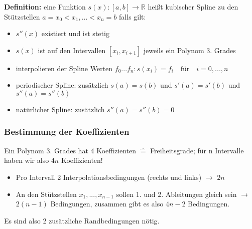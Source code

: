 \documentclass{scrartcl}
\begin{document}
\textbf{Definition:} eine Funktion $s(x):[a,b] \rightarrow \mathbb{R}$ heißt kubischer Spline zu den Stützstellen $a=x_0<x_1,...<x_n=b$ falls gilt:
\begin{itemize}
\item $s''(x)$ existiert und ist stetig
\item $s(x)$ ist auf den Intervallen $[x_i,x_{i+1}]$ jeweils ein Polynom 3. Grades
\item interpolieren der Spline Werten $f_0...f_n:s(x_i)=f_i \quad \text{für} \quad i=0,...,n$
\item periodischer Spline: zusätzlich $s(a)=s(b)$ und $s'(a)=s'(b)$ und $s''(a)=s''(b)$
\item natürlicher Spline: zusätzlich $s''(a)=s''(b)=0$
\end{itemize}
\subsubsection*{Bestimmung der Koeffizienten}
Ein Polynom 3. Grades hat 4 Koeffizienten $\hat{=}$ Freiheitsgrade; für n Intervalle haben wir also $4n$ Koeffizienten!

\begin{itemize}
\item Pro Intervall 2 Interpolationsbedingungen (rechts und links) $\rightarrow$ $2n$
\item An den Stützstellen $x_1,...,x_{n-1}$ sollen 1. und 2. Ableitungen gleich sein $\rightarrow$ $2(n-1)$ Bedingungen, zusammen gibt es also $4n-2$ Bedingungen.
\end{itemize}
Es sind also 2 zusätzliche Randbedingungen nötig.
\end{document}
